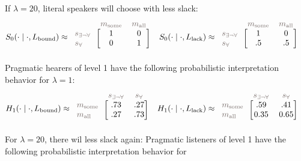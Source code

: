 \documentclass[a4paper, 11pt]{article}
\theoremstyle{Satz}
\newcommand{\state}{\ensuremath{s}\xspace}		%
\newcommand{\mystate}[1]{\ensuremath{\state_{\text{#1}}}\xspace} %
\newcommand{\mylang}[1]{\ensuremath{L_{\text{#1}}}\xspace} %
\newcommand{\messg}{\ensuremath{m}\xspace}		%
\newcommand{\mymessg}[1]{\ensuremath{\messg_{\text{#1}}}\xspace} %
\newcommand{\ssome}{\mystate{\ensuremath{\exists\neg\forall}}}
\newcommand{\sall}{\mystate{\ensuremath{\forall}}}
\newcommand{\msome}{\mymessg{some}}
\newcommand{\mall}{\mymessg{all}}
\newcommand{\Lbound}{\mylang{bound}}
\newcommand{\Llack}{\mylang{lack}}
\newcommand{\mygray}[1]{{\textcolor{mygray}{#1}}}
\begin{document}
If $\lambda = 20$, literal speakers will choose with less slack:
\begin{align*}
  S_0(\cdot \mid \cdot, \Lbound) & \approx \begin{blockarray}{lcc}
    & \mygray{\msome} & \mygray{\mall} \\
    \begin{block}{l[cc]}
      \mygray{\ssome} & 1 & 0 \\
      \mygray{\sall}  & 0 & 1 \\
    \end{block}
  \end{blockarray} &
  S_0(\cdot \mid \cdot, \Llack) & \approx \begin{blockarray}{lcc}
    & \mygray{\msome} & \mygray{\mall} \\
    \begin{block}{l[cc]}
      \mygray{\ssome} &  1 & 0 \\
      \mygray{\sall}  & .5 & .5 \\
    \end{block}
  \end{blockarray} 
\end{align*}
Pragmatic hearers of level 1 have the following probabilistic interpretation behavior for
$\lambda = 1$:
\begin{align*}
  H_1(\cdot \mid \cdot, \Lbound) & \approx \begin{blockarray}{lcc}
    & \mygray{\ssome} & \mygray{\sall} \\
    \begin{block}{l[cc]}
      \mygray{\msome} & .73 & .27 \\
      \mygray{\mall}  & .27 & .73 \\
    \end{block}
  \end{blockarray} &
  H_1(\cdot \mid \cdot, \Llack) & \approx \begin{blockarray}{lcc}
    & \mygray{\ssome} & \mygray{\sall} \\
    \begin{block}{l[cc]}
      \mygray{\msome} & .59 & .41 \\
      \mygray{\mall}  & 0.35 & 0.65 \\
    \end{block}
  \end{blockarray} 
\end{align*}
For $\lambda = 20$, there wil less slack again:
Pragmatic listeners of level 1 have the following probabilistic interpretation behavior for
\end{document}
